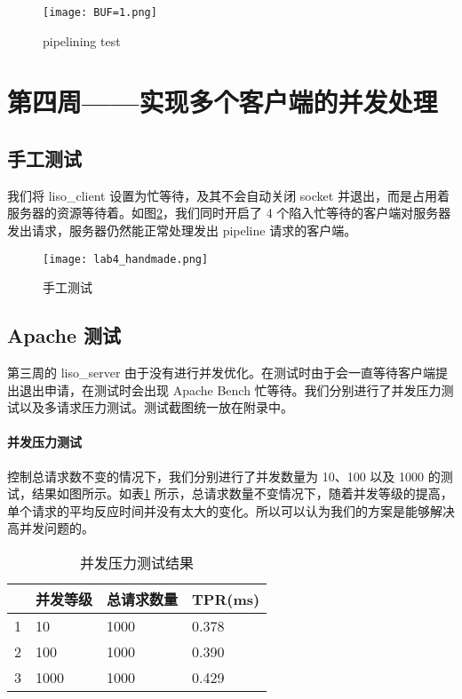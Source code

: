 \begin{figure}[htbp!]
    \centering 
    \texttt{[image: BUF=1.png]}
    \caption{pipelining test}
    \label{fig:pipelining}
\end{figure}


\section{第四周——实现多个客户端的并发处理}

\subsection{手工测试}
我们将 liso\_client 设置为忙等待，及其不会自动关闭 socket 并退出，而是占用着服务器的资源等待着。如图\ref{fig:lab4test1}，我们同时开启了 4 个陷入忙等待的客户端对服务器发出请求，服务器仍然能正常处理发出 pipeline 请求的客户端。


\begin{figure}[htbp!]
    \centering 
    \texttt{[image: lab4\_handmade.png]}
    \caption{手工测试}
    \label{fig:lab4test1}
\end{figure}

\subsection{Apache 测试} 

第三周的 liso\_server 由于没有进行并发优化。在测试时由于会一直等待客户端提出退出申请，在测试时会出现 Apache Bench 忙等待。我们分别进行了并发压力测试以及多请求压力测试。测试截图统一放在附录中。

\paragraph*{并发压力测试} 控制总请求数不变的情况下，我们分别进行了并发数量为 10、100 以及 1000 的测试，结果如图所示。如表\ref{tab:parallel} 所示，总请求数量不变情况下，随着并发等级的提高，单个请求的平均反应时间并没有太大的变化。所以可以认为我们的方案是能够解决高并发问题的。

\begin{table}[htbp!]
    \centering
    \begin{tabular}{llll}\hline
      & 并发等级 & 总请求数量 & TPR(ms)   \\\hline
    1 & 10   & 1000  & 0.378 \\
    2 & 100  & 1000  & 0.390 \\
    3 & 1000 & 1000  & 0.429\\
    \hline
    \end{tabular}
    \caption{并发压力测试结果}\label{tab:parallel}
\end{table}

